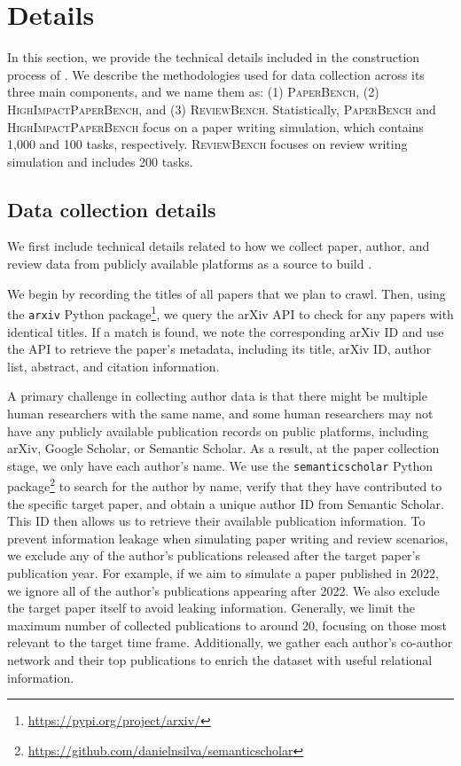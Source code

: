 \section{\benchname Details}
\label{research-bench-tech-details}
In this section, we provide the technical details included in the construction process of \benchname. We describe the methodologies used for data collection across its three main components, and we name them as: (1) \textsc{PaperBench}, (2) \textsc{HighImpactPaperBench}, and (3) \textsc{ReviewBench}. Statistically, \textsc{PaperBench} and \textsc{HighImpactPaperBench} focus on a paper writing simulation, which contains 1,000 and 100 tasks, respectively. \textsc{ReviewBench} focuses on review writing simulation and includes 200 tasks.

\subsection{Data collection details}
\label{data-collection}
We first include technical details related to how we collect paper, author, and review data from publicly available platforms as a source to build \benchname.

 We begin by recording the titles of all papers that we plan to crawl. Then, using the \texttt{arxiv} Python package\footnote{\url{https://pypi.org/project/arxiv/}}, we query the arXiv API to check for any papers with identical titles. If a match is found, we note the corresponding arXiv ID and use the API to retrieve the paper’s metadata, including its title, arXiv ID, author list, abstract, and citation information.

 A primary challenge in collecting author data is that there might be multiple human researchers with the same name, and some human researchers may not have any publicly available publication records on public platforms, including arXiv, Google Scholar, or Semantic Scholar. As a result, at the paper collection stage, we only have each author’s name. We use the \texttt{semanticscholar} Python package\footnote{\url{https://github.com/danielnsilva/semanticscholar}} to search for the author by name, verify that they have contributed to the specific target paper, and obtain a unique author ID from Semantic Scholar. This ID then allows us to retrieve their available publication information. To prevent information leakage when simulating paper writing and review scenarios, we exclude any of the author’s publications released after the target paper’s publication year. For example, if we aim to simulate a paper published in 2022, we ignore all of the author’s publications appearing after 2022. We also exclude the target paper itself to avoid leaking information. Generally, we limit the maximum number of collected publications to around 20, focusing on those most relevant to the target time frame. Additionally, we gather each author’s co-author network and their top publications to enrich the dataset with useful relational information.

